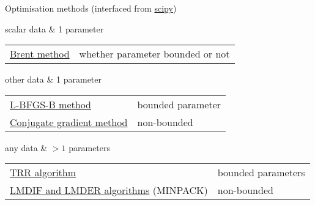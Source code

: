 \begin{frame}{Optimisation methods (interfaced from \href{https://docs.scipy.org/doc/}{scipy})}
\hfill

\begin{block}{scalar data \& 1 parameter}
\begin{tabular}{ll}
\href{https://docs.scipy.org/doc/scipy/reference/generated/scipy.optimize.minimize_scalar.html}{Brent method} & whether  parameter bounded or not
\end{tabular}\end{block}

\begin{block}{other data \& 1 parameter}
\begin{tabular}{ll}
\href{https://docs.scipy.org/doc/scipy/reference/generated/scipy.optimize.minimize.html
}{L-BFGS-B method} &bounded parameter\\[.5ex]
\href{https://docs.scipy.org/doc/scipy/reference/generated/scipy.optimize.minimize.html}{Conjugate gradient method} &non-bounded
\\
\end{tabular}\end{block}
\begin{block}{any data \& $>1$ parameters}
\begin{tabular}{ll}
\href{https://docs.scipy.org/doc/scipy/reference/generated/scipy.optimize.least_squares.html}{TRR algorithm} &bounded parameters\\[.5ex]
\href{https://docs.scipy.org/doc/scipy/reference/generated/scipy.optimize.leastsq.html}{LMDIF and LMDER algorithms} (MINPACK) &non-bounded
\end{tabular}\end{block}
\end{frame}
